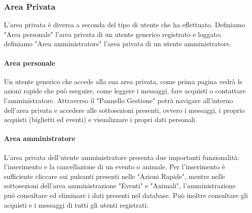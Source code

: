         \subsubsection{Area Privata}
            L'area privata è diversa a seconda del tipo di utente che ha effettuato. Definiamo "Area personale" l'area privata di un utente generico registrato e loggato; definiamo "Area amministratore" l'area privata di un utente amministratore.
            \paragraph{Area personale} Un utente generico che accede alla sua area privata, come prima pagina vedrà le azioni rapide che può eseguire, come leggere i messaggi, fare acquisti o contattare l'amministratore. Attraverso il "Pannello Gestione" potrà navigare all'interno dell'area privata e accedere alle sottosezioni presenti, ovvero i messaggi, i proprio acquisti (biglietti ed eventi) e visualizzare i propri dati personali.
            \paragraph{Area amministratore} L'area privata dell'utente amministratore presenta due importanti funzionalità: l'inserimento e la cancellazione di un evento o animale. Per l'inserimento è sufficiente cliccare sui pulsanti presenti nelle "Azioni Rapide", mentre nelle sottosezioni dell'area amministrazione "Eventi" e "Animali", l'amministrazione può consultare ed eliminare i dati presenti nel database. Può inoltre consultare gli acquisti e i messaggi di tutti gli utenti registrati.

\pagebreak